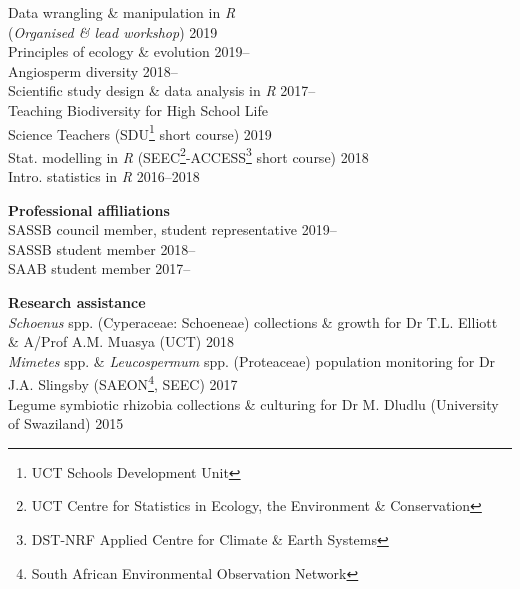 \documentclass[10pt]{article}
\begin{document}
\begin{multicols}{2}
Data wrangling \& manipulation in \textit{R} \\
\hspace{2em} (\textit{Organised \& lead workshop})       \hfill {\small 2019} \\
Principles of ecology \& evolution                     \hfill {\small 2019--} \\
Angiosperm diversity                                   \hfill {\small 2018--} \\
Scientific study design \& data analysis in \textit{R} \hfill {\small 2017--} \\
Teaching Biodiversity for High School Life \\
\hspace{2em} Science Teachers {\small (SDU\footnote{UCT Schools Development
  Unit} short course)}                                   \hfill {\small 2019} \\
Stat. modelling in \textit{R} {\small (SEEC\footnote{UCT Centre for
  Statistics in Ecology, the Environment \& Conservation}-ACCESS\footnote{
  DST-NRF Applied Centre for Climate \& Earth Systems} short course)}
                                                         \hfill {\small 2018} \\
Intro. statistics in \textit{R}                       \hfill {\small 2016--2018}

\hfill

\textbf{Professional affiliations}\\
SASSB council member, student representative           \hfill {\small 2019--} \\
SASSB student member                                   \hfill {\small 2018--} \\
SAAB student member                                       \hfill {\small 2017--}

\end{multicols}

\textbf{Research assistance}\\
\textit{Schoenus} spp. (Cyperaceae: Schoeneae) collections \& growth for Dr
  T.L. Elliott \& A/Prof A.M. Muasya {\small (UCT)}      \hfill {\small 2018} \\
\textit{Mimetes} spp. \& \textit{Leucospermum} spp. (Proteaceae) population
  monitoring for Dr J.A. Slingsby {\small (SAEON\footnote{South African
  Environmental Observation Network}, SEEC)}             \hfill {\small 2017} \\
Legume symbiotic rhizobia collections \& culturing for Dr M. Dludlu
  {\small (University of Swaziland)}                        \hfill {\small 2015}
\end{document}

